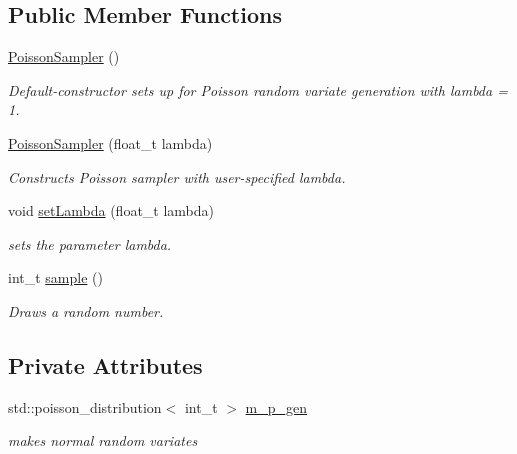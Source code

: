 \subsection*{Public Member Functions}
\begin{DoxyCompactItemize}
\item 
\mbox{\label{classrvsamp_1_1PoissonSampler_a211f4f682217e095f64f825b6ff372e4}} 
\hyperlink{classrvsamp_1_1PoissonSampler_a211f4f682217e095f64f825b6ff372e4}{Poisson\+Sampler} ()
\begin{DoxyCompactList}\small\item\em Default-\/constructor sets up for Poisson random variate generation with lambda = 1. \end{DoxyCompactList}\item 
\hyperlink{classrvsamp_1_1PoissonSampler_ac0a7d1c44968588326518e73b6ce11e3}{Poisson\+Sampler} (float\+\_\+t lambda)
\begin{DoxyCompactList}\small\item\em Constructs Poisson sampler with user-\/specified lambda. \end{DoxyCompactList}\item 
void \hyperlink{classrvsamp_1_1PoissonSampler_ad376dabecbb8ae862e71e45958009e4d}{set\+Lambda} (float\+\_\+t lambda)
\begin{DoxyCompactList}\small\item\em sets the parameter lambda. \end{DoxyCompactList}\item 
int\+\_\+t \hyperlink{classrvsamp_1_1PoissonSampler_ad03710cfc36a888768bbcc7f05da4458}{sample} ()
\begin{DoxyCompactList}\small\item\em Draws a random number. \end{DoxyCompactList}\end{DoxyCompactItemize}
\subsection*{Private Attributes}
\begin{DoxyCompactItemize}
\item 
\mbox{\label{classrvsamp_1_1PoissonSampler_aea0e59f4851e1b2048ab0e85e1edbc3b}} 
std\+::poisson\+\_\+distribution$<$ int\+\_\+t $>$ \hyperlink{classrvsamp_1_1PoissonSampler_aea0e59f4851e1b2048ab0e85e1edbc3b}{m\+\_\+p\+\_\+gen}
\begin{DoxyCompactList}\small\item\em makes normal random variates \end{DoxyCompactList}\end{DoxyCompactItemize}
